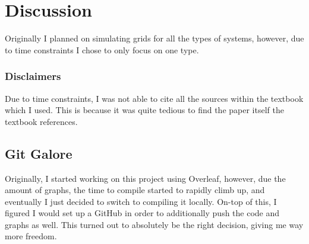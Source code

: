\documentclass[12pt, a4paper]{article}
\begin{document}
\section{\centering Discussion}   
    Originally I planned on simulating grids for all the types of systems, however, due to time constraints I chose to only focus on one type. 

    \subsubsection{Disclaimers}
        Due to time constraints, I was not able to cite all the sources within the textbook \cite{TaurisvandenHeuvel+2023} which I used. This is because it was quite tedious to find the paper itself the textbook references. 

    \subsection{Git Galore}
    Originally, I started working on this project using Overleaf, however, due the amount of graphs, the time to compile started to rapidly climb up, and eventually I just decided to switch to compiling it locally. On-top of this, I figured I would set up a GitHub in order to additionally push the code and graphs as well. This turned out to absolutely be the right decision, giving me way more freedom.
    
\printbibliography[
heading=bibintoc,
title={\centering Sources}
]
\end{document}
